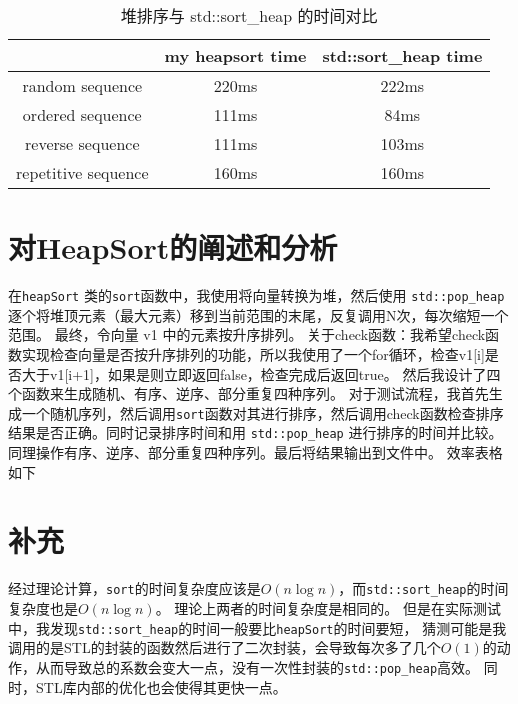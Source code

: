 \documentclass[UTF8]{ctexart}
\begin{document}
\pagestyle{fancy}
\fancyhead{}



\begin{table}[h!]
\centering
\begin{tabular}{|c|c|c|}
\hline
 & my heapsort time & std::sort\_heap time \\
\hline
random sequence & 220ms & 222ms \\
\hline
ordered sequence & 111ms & 84ms \\
\hline
reverse sequence & 111ms & 103ms \\
\hline
repetitive sequence & 160ms & 160ms \\
\hline
\end{tabular}
\caption{堆排序与 std::sort_heap 的时间对比}
\label{tab:example}
\end{table}

\section{对HeapSort的阐述和分析}
在\texttt{heapSort} 类的\texttt{sort}函数中，我使用将向量转换为堆，然后使用 \texttt{std::pop\_heap} 逐个将堆顶元素（最大元素）移到当前范围的末尾，反复调用N次，每次缩短一个范围。
最终，令向量 v1 中的元素按升序排列。
关于check函数：我希望check函数实现检查向量是否按升序排列的功能，所以我使用了一个for循环，检查v1[i]是否大于v1[i+1]，如果是则立即返回false，检查完成后返回true。  
然后我设计了四个函数来生成随机、有序、逆序、部分重复四种序列。
对于测试流程，我首先生成一个随机序列，然后调用\texttt{sort}函数对其进行排序，然后调用check函数检查排序结果是否正确。同时记录排序时间和用 \texttt{std::pop\_heap} 进行排序的时间并比较。
同理操作有序、逆序、部分重复四种序列。最后将结果输出到文件中。
效率表格如下


\section{补充}

经过理论计算，\texttt{sort}的时间复杂度应该是$O(n\log n)$，而\texttt{std::sort\_heap}的时间复杂度也是$O(n\log n)$。
理论上两者的时间复杂度是相同的。
但是在实际测试中，我发现\texttt{std::sort\_heap}的时间一般要比\texttt{heapSort}的时间要短，
猜测可能是我调用的是STL的封装的函数然后进行了二次封装，会导致每次多了几个$O(1)$的动作，从而导致总的系数会变大一点，没有一次性封装的\texttt{std::pop\_heap}高效。
同时，STL库内部的优化也会使得其更快一点。
\end{document}
